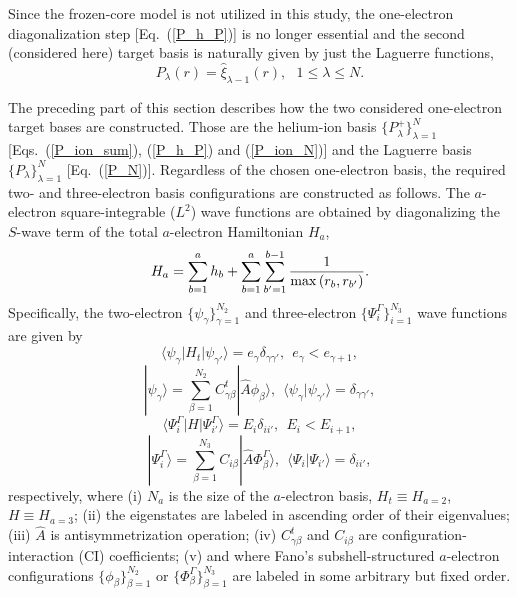 \documentclass[aip
, pra
, showpacs
, aps
, twocolumn
, groupedaddress
, floatfix
]{revtex4}
\newcommand{\beq}{\begin{equation}}
\newcommand{\eeq}{\end{equation}}
\begin{document}
Since the frozen-core model is not utilized in this study,
the one-electron diagonalization step [Eq.~(\ref{P_h_P})] is no longer essential
and the second (considered here) target basis is naturally given by just the Laguerre functions,
\beq
P_\lambda(r)= \hat{\xi}_{\lambda-1}(r),  \ \ \ 1 \leq \lambda \leq N.
\label{P_N} \eeq


The preceding part of this section describes how the two considered one-electron target bases are constructed.
Those are the helium-ion basis $\{P^+_\lambda\}_{\lambda=1}^{N}$ [Eqs.~(\ref{P_ion_sum}), (\ref{P_h_P}) and (\ref{P_ion_N})] and the Laguerre basis $\{P_\lambda\}_{\lambda=1}^{N}$ [Eq.~(\ref{P_N})]. Regardless of the chosen one-electron basis, the required two- and three-electron basis configurations are constructed as follows.
The $a$-electron square-integrable ($L^2$) wave functions
are obtained by diagonalizing the $S$-wave term of the total $a$-electron  Hamiltonian $H_a$,
\beq
H_{a} = \sum_{b=1}^{a} h_b + \sum_{b=1}^{a} \sum_{b'=1}^{b-1}
\frac{1}{\max{(r_{b}, r_{b'})}}. \\
\label{H_a}
\eeq
Specifically, the two-electron $\{ \psi_{\gamma} \}_{\gamma=1}^{N_2}$ and three-electron
$\{ \Psi^{\Gamma}_i \}_{i=1}^{N_3}$ wave functions  are given by
\beq
\langle\psi_\gamma|H_t|\psi_{\gamma'}\rangle=e_\gamma \delta_{\gamma\gamma'}, \ \
 e_\gamma < e_{\gamma+1},
\label{psi_H_psi}
\eeq
\beq
| \psi_\gamma \rangle= \sum_{\beta=1}^{N_2} C^t_{\gamma\beta} | \hat{A}\phi_\beta \rangle, \ \
\langle\psi_\gamma|\psi_{\gamma'}\rangle=\delta_{\gamma\gamma'},
\label{psi_H_psi_2}
\eeq
\beq
\langle\Psi_i^\Gamma|H|\Psi_{i'}^\Gamma\rangle=E_i\delta_{ii'},
\ \  E_i < E_{i+1},
\label{Psi_from_Fano} \eeq
\beq
| \Psi_i^\Gamma \rangle= \sum_{\beta=1}^{N_3} C_{i\beta} | \hat{A}\Phi_\beta^\Gamma \rangle,
 \ \ \langle\Psi_i|\Psi_{i'}\rangle=\delta_{ii'},
\label{Psi_from_Fano_2} \eeq
respectively,
where (i) $N_a$ is the size of the $a$-electron basis, $H_t \equiv H_{a=2}$, $H \equiv H_{a=3}$;
(ii) the eigenstates are labeled in ascending order of their eigenvalues; (iii) $\hat{A}$ is antisymmetrization operation;
(iv) $C^t_{\gamma\beta}$ and $C_{i \beta}$  are configuration-interaction (CI) coefficients;
(v) and where Fano's \cite{Fano65,KFB11} subshell-structured $a$-electron configurations $\{ \phi_{\beta} \}_{\beta=1}^{N_2}$
or $\{ \Phi_\beta^\Gamma \}_{\beta=1}^{N_3}$
are labeled in some arbitrary but fixed order.
\end{document}
